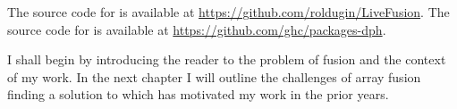 \documentclass[preamble.tex]{subfiles}
\begin{document}
The source code for \LiveFusion is available at \url{https://github.com/roldugin/LiveFusion}. The source code for  is available at \url{https://github.com/ghc/packages-dph}.

I shall begin by introducing the reader to the problem of fusion and the context of my work. In the next chapter I will outline the challenges of array fusion finding a solution to which has motivated my work in the prior years.





\IfNotCompilingAll{}
\end{document}
